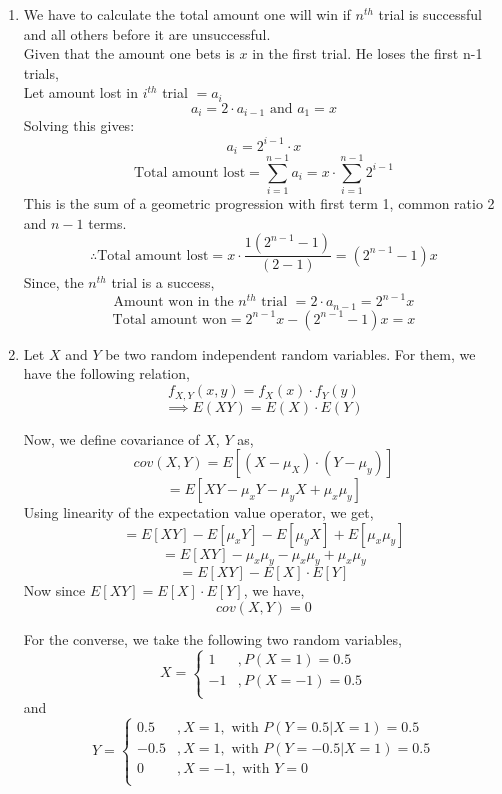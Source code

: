 \documentclass[11pt]{article}
\begin{document}
\begin{enumerate}
	\item{
    	We have to calculate the total amount one will win if $ n^{th} $  trial is successful and all others before it are unsuccessful.\\
        Given that the amount one bets is $ x $ in the first trial. He loses the first n-1 trials,\\
        Let amount lost in $ i^{th} $ trial $= a_i$\\
        $$a_i = 2 \cdot a_{i-1}  \text{ and }  a_1 = x$$
        Solving this gives: \\
        $$a_i = 2^{i-1} \cdot x$$
        $$\text{Total amount lost} = \sum_{i=1}^{n-1}a_i = x \cdot \sum_{i=1}^{n-1}2^{i-1}$$
        This is the sum of a geometric progression with first term 1, common ratio 2 and $n-1$ terms.\\
        $$\therefore \text{Total amount lost} = x \cdot \frac{1(2^{n-1}-1)}{(2-1)} = (2^{n-1}-1)x$$
        Since, the $n^{th}$ trial is a success,\\
        $$\text{Amount won in the } n^{th} \text{ trial }  = 2\cdot a_{n-1} = 2^{n-1}x$$
        $$\text{Total amount won} = 2^{n-1}x - (2^{n-1}-1)x = x$$
	}	

	\item{
		Let $X$ and $Y$ be two random independent random variables. For them, we have the following relation,
		$$f_{X,Y}(x,y) = f_X(x)\cdot f_Y(y)$$
		$$\implies E(XY) = E(X)\cdot E(Y)  $$

		Now, we define covariance of $X$, $Y$ as, 
		$$ cov(X,Y) = E[(X-\mu_X)\cdot(Y-\mu_y)] $$
		$$ = E[XY - \mu_xY - \mu_yX + \mu_x\mu_y]$$
		Using linearity of the expectation value operator, we get,
		$$ = E[XY] - E[\mu_xY] - E[\mu_yX] + E[\mu_x\mu_y]$$
		$$ = E[XY] - \mu_x\mu_y - \mu_x\mu_y + \mu_x\mu_y$$
		$$ = E[XY] - E[X]\cdot E[Y] $$
		Now since $E[XY] = E[X]\cdot E[Y]$, we have,
		$$cov(X,Y) = 0 $$

		For the converse, we take the following two random variables,
		\[X =  \begin{cases} 
		      1 &  ,P(X=1) = 0.5 \\
		      -1 &  ,P(X=-1) = 0.5\\
		   \end{cases}
		\]
		and
		\[Y =  \begin{cases} 
		      0.5 & ,X=1 ,\text{ with } P(Y=0.5 | X=1) = 0.5 \\
		      -0.5 & ,X=1 ,\text{ with } P(Y=-0.5 | X=1) = 0.5  \\
		      0 & ,X = -1 ,\text{ with } Y=0 \\
		   \end{cases}
		\]

}
\end{enumerate}
\end{document}
